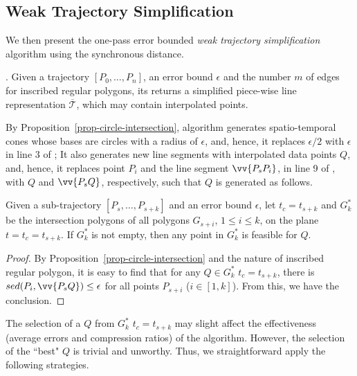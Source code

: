 \subsection{Weak Trajectory Simplification}

We then present the one-pass error bounded {\em weak trajectory simplification} algorithm using the synchronous distance.




.
Given a trajectory ${[P_0, \ldots, P_n]}$, an error bound $\epsilon$ and the number $m$ of edges for inscribed
regular polygons, its returns a simplified  piece-wise line representation $\overline{\mathcal{T}}$,
which may contain interpolated points.

By Proposition~\ref{prop-circle-intersection}, algorithm \cista generates spatio-temporal cones whose bases are circles with a radius of $\epsilon$,
and, hence, it replaces $\epsilon/2$ with $\epsilon$ in line 3 of \cist;
It also generates new line segments with interpolated data points $Q$, and, hence, it replaces point $P_i$ and the line segment $\vv{P_sP_i}$, in line 9 of \cist, with $Q$ and $\vv{P_sQ}$, respectively, such that $Q$ is generated as follows.


\begin{prop}
\label{prop-cist-Q}
Given a sub-trajectory ${[P_s, \ldots, P_{s+k}]}$ and an error bound $\epsilon$,  let $t_c=t_{s+k}$ and $G^*_k$ be the intersection polygons of all polygons $G_{s+i}$, $1\le i\le k$, on the plane $t=t_c=t_{s+k}$. If $G^*_k$ is not empty, then any point in $G^*_k$ is feasible for $Q$.
\end{prop}

\begin{proof}
By Proposition~\ref{prop-circle-intersection} and the nature of inscribed regular polygon, it is easy to find that for any $Q \in G^*_k$  \wrt $t_c=t_{s+k}$, there is $sed(P_i, \vv{P_sQ})\le \epsilon$ for all points $P_{s+i}$ ($i \in [1,k]$). From this, we have the conclusion.
\end{proof}

The selection of a $Q$ from $G^*_k$ \wrt $t_c=t_{s+k}$ may slight affect the effectiveness (\eg average errors and compression ratios) of the algorithm. However, the selection of the ``best" $Q$ is trivial and unworthy. Thus, we straightforward apply the following strategies.

